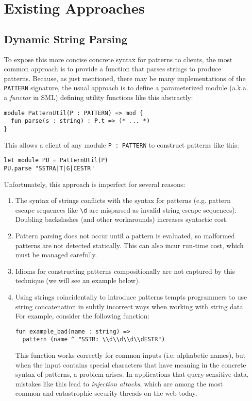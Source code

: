 \documentclass[preprint]{sigplanconf}
\let\li\lstinline
\begin{document}
\section{Existing Approaches}\label{sec:syntax-existing}
\subsection{Dynamic String Parsing}
To expose this more concise concrete syntax for patterns to clients, the most common approach is to provide a function that parses strings to produce patterns. Because, as just mentioned, there  may be many implementations of the \lstinline{PATTERN} signature, the usual approach is to define a parameterized module (a.k.a. a \emph{functor} in SML) defining utility functions like this abstractly:

\begin{lstlisting}[numbers=none]
module PatternUtil(P : PATTERN) => mod {
  fun parse(s : string) : P.t => (* ... *)
}
\end{lstlisting}
This allows a client of any module \lstinline{P : PATTERN} 
to construct patterns like this:
\begin{lstlisting}[numbers=none]
let module PU = PatternUtil(P)
PU.parse "SSTRA|T|G|CESTR"
\end{lstlisting}
Unfortunately, this approach is imperfect for several reasons:
\begin{enumerate} 
\item The syntax of strings conflicts with the syntax for patterns (e.g. pattern escape sequences like \li{\d} are misparsed as invalid string escape sequences). Doubling backslashes (and other workarounds) increases syntactic cost.
\item Pattern parsing does not occur until a pattern is evaluated, so malformed patterns are not detected statically. This can also incur run-time cost, which must be managed carefully.
\item Idioms for constructing patterns compositionally are not captured by this technique (we will see an example below).
\item Using strings coincidentally to introduce patterns tempts programmers to use string concatenation in subtly incorrect ways when working with string data. For example, consider the following function:
\begin{lstlisting}[numbers=none,escapechar=|]
fun example_bad(name : string) => 
  pattern (name ^ "SSTR: \\d\\d\\d\\dESTR")
\end{lstlisting}

This function works correctly for common inputs (i.e. alphabetic names), but when the input contains special characters that have meaning in the concrete syntax of patterns, a problem arises. In applications that query sensitive data, mistakes like this lead to \emph{injection attacks}, which are among the most common and catastrophic security threads on the web today.
\end{enumerate}
\end{document}
